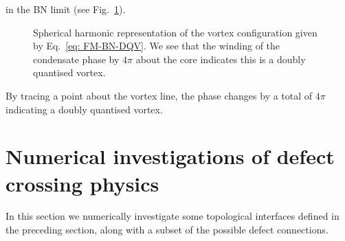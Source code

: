 in the BN limit (see Fig.~\ref{fig: BN-DQV}).
\begin{figure}
    \centering
    \caption{\label{fig: BN-DQV} Spherical harmonic
        representation of the vortex configuration given by
        Eq.~\eqref{eq: FM-BN-DQV}.
        We see that the winding of the condensate phase by \(4\pi \) about the
        core indicates this is a doubly quantised vortex.}
\end{figure}
By tracing a point about the vortex line, the phase changes by a total of
\(4\pi \) indicating a doubly quantised vortex.

\section{Numerical investigations of defect crossing physics}
In this section we numerically investigate some topological interfaces defined
in the preceding section, along with a subset of the possible defect
connections.

